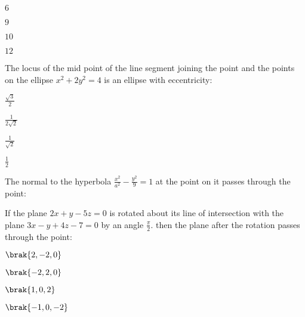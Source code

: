 \hfill{}
\begin{enumerate}
\begin{multicols}{4}
\item $6$
\item $9$
\item $10$
\item $12$
\end{multicols}
\end{enumerate}

\item The locus of the mid point of the line segment joining the point  and the points on the ellipse $x^2+2y^2=4$ is an ellipse with eccentricity:

\hfill{}
\begin{enumerate}
\begin{multicols}{4}
\item $\frac{\sqrt{3}}{2}$
\item $\frac{1}{2\sqrt{2}}$
\item $\frac{1}{\sqrt{2}}$
\item $\frac{1}{2}$
\end{multicols}
\end{enumerate}

\item The normal to the hyperbola $\frac{x^2}{a^2}-\frac{y^2}{9}=1$ at the point  on it passes through the point:

\hfill{}
\begin{enumerate}
\begin{multicols}{4}
\item {}
\item {}
\item {}
\item {}
\end{multicols}
\end{enumerate}

\item If the plane $2x+y-5z=0$ is rotated about its line of intersection with the plane $3x-y+4z-7=0$ by an angle $\frac{\pi}{2}$. then the plane after the rotation passes through the point:

\hfill{}
\begin{enumerate}
\begin{multicols}{4}
\item $\brak{2,-2,0}$
\item $\brak{-2,2,0}$
\item $\brak{1,0,2}$
\item $\brak{-1,0,-2}$
\end{multicols}
\end{enumerate}

